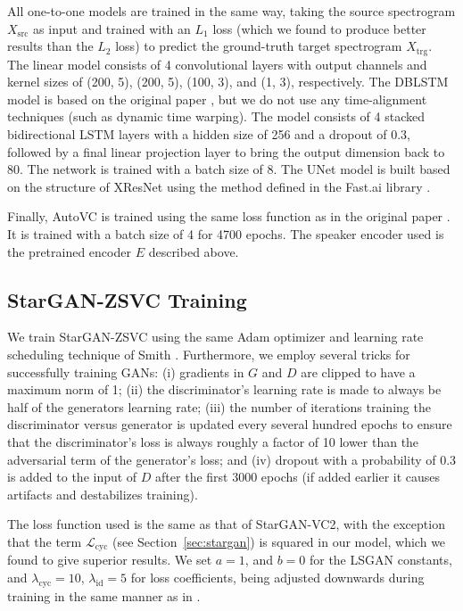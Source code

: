All one-to-one models are trained in the same way, taking the source spectrogram $X_{\text{src}}$ as input and trained with an $L_1$ loss (which we found to produce better results than the $L_2$ loss) to predict the ground-truth target spectrogram $X_{\text{trg}}$. 
The linear model consists of 4 convolutional layers with output channels and kernel sizes of (200, 5), (200, 5), (100, 3), and (1, 3), respectively. 
The DBLSTM model is based on the original 
paper \cite{BDLSTM}, but we do not use any time-alignment techniques (such as dynamic time warping). 
The model consists of 4 stacked bidirectional LSTM layers with a hidden size of 256 and a dropout of 0.3, followed by a final linear projection layer to bring the output dimension back to 80. The network is trained with a batch size of 8.
The UNet model is built based on the structure of XResNet \cite{xresnet} using the method defined in the Fast.ai library \cite{fastai:unet}.

Finally, AutoVC is trained using the same loss function as in the original paper \cite{autovc}. It is trained with a batch size of 4 for 4700 epochs. 
The speaker encoder used is the pretrained encoder $E$ described above. 

\subsection{StarGAN-ZSVC Training}
We train StarGAN-ZSVC using the same Adam optimizer and learning rate scheduling technique of Smith \cite{smith:cyclic}.
Furthermore, we employ several tricks for successfully training GANs: 
(i) gradients in $G$ and $D$ are clipped to have a maximum norm of 1; 
(ii) the discriminator's learning rate is made to always be half of the generators learning rate; 
(iii) the number of iterations training the discriminator versus generator is updated every several hundred epochs to ensure that the discriminator's loss is always roughly a factor of 10 lower than the adversarial term of the generator's loss; and
(iv) dropout with a probability of 0.3 is added to the input of $D$ after the first 3000 epochs (if added earlier it causes artifacts and destabilizes training). 

The loss function used is the same as that of StarGAN-VC2, with the exception that the term $\mathcal{L}_\text{cyc}$ (see Section~\ref{sec:stargan}) is squared in our model, which we found to give superior results. 
We set $a = 1$, and $b=0$ for the LSGAN constants, and $\lambda_{\text{cyc}} = 10$, $\lambda_{\text{id}} = 5$ for loss coefficients, being adjusted downwards during training in the same manner as in \cite{stargan-vc2}. 


